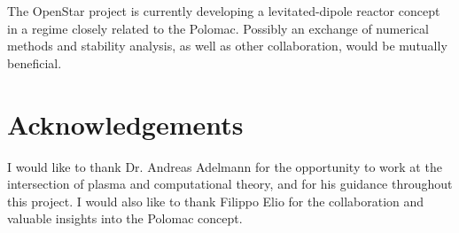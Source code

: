 The OpenStar project is currently developing a levitated-dipole reactor concept in a
regime closely related to the Polomac. Possibly an exchange of numerical methods and stability
analysis, as well as other collaboration, would be mutually beneficial.



\section{Acknowledgements}

I would like to thank Dr. Andreas Adelmann for the opportunity to work at the intersection 
of plasma and computational theory, and for his guidance throughout this project. 
I would also like to thank Filippo Elio for the collaboration and valuable insights 
into the Polomac concept.